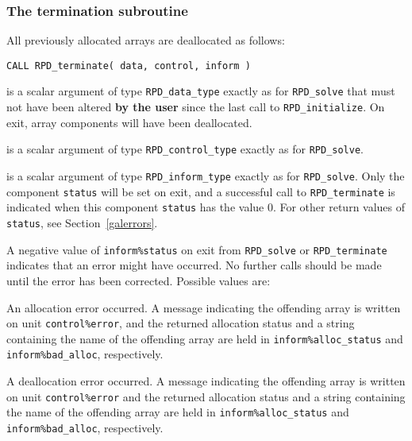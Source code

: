 \documentclass{galahad}
\newcommand{\packagename}{RPD}
\begin{document}
\begin{description}
\begin{description}
\end{description}


\subsubsection{The  termination subroutine}
All previously allocated arrays are deallocated as follows:

\hskip0.5in
{\tt CALL \packagename\_terminate( data, control, inform )}

\begin{description}

 is a scalar \intentinout argument of type
{\tt \packagename\_data\_type}
exactly as for
{\tt \packagename\_solve}
that must not have been altered {\bf by the user} since the last call to
{\tt \packagename\_initialize}.
On exit, array components will have been deallocated.

 is a scalar \intentin argument of type
{\tt \packagename\_control\_type}
exactly as for
{\tt \packagename\_solve}.

 is a scalar \intentout argument of type
{\tt \packagename\_inform\_type}
exactly as for
{\tt \packagename\_solve}.
Only the component {\tt status} will be set on exit, and a
successful call to
{\tt \packagename\_terminate}
is indicated when this  component {\tt status} has the value 0.
For other return values of {\tt status}, see Section~\ref{galerrors}.

\end{description}


\galerrors
A negative value of  {\tt inform\%status} on exit from
{\tt \packagename\_solve}
or
{\tt \packagename\_terminate}
indicates that an error might have occurred. No further calls should be made
until the error has been corrected. Possible values are:

\begin{description}
 An allocation error occurred. A message indicating
the offending
array is written on unit {\tt control\%error}, and the returned allocation
status and a string containing the name of the offending array
are held in {\tt inform\%alloc\_\-status}
and {\tt inform\%bad\_alloc}, respectively.

 A deallocation error occurred.
A message indicating the offending
array is written on unit {\tt control\%error} and the returned allocation
status and a string containing the name of the offending array
are held in {\tt inform\%alloc\_\-status}
and {\tt inform\%bad\_alloc}, respectively.


\end{description}
\end{description}
\end{document}
